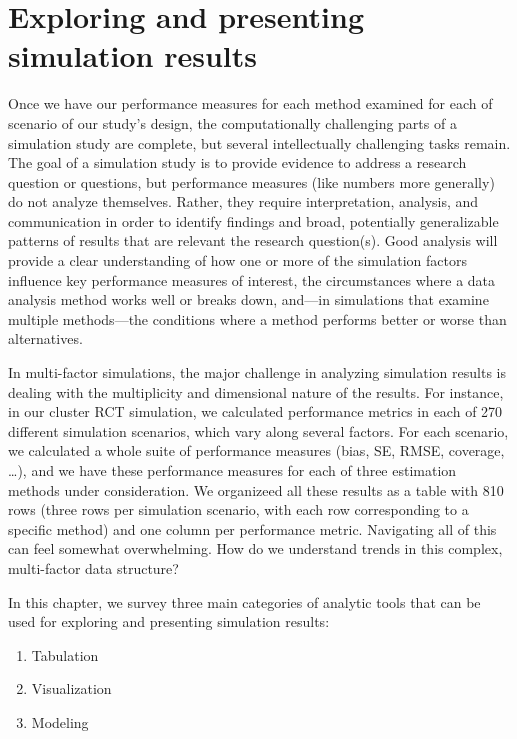 \documentclass[
]{book}
\providecommand{\tightlist}{%
  \setlength{\itemsep}{0pt}\setlength{\parskip}{0pt}}
\begin{document}
\chapter{Exploring and presenting simulation results}\label{presentation-of-results}

Once we have our performance measures for each method examined for each of scenario of our study's design, the computationally challenging parts of a simulation study are complete, but several intellectually challenging tasks remain.
The goal of a simulation study is to provide evidence to address a research question or questions, but
performance measures (like numbers more generally) do not analyze themselves.
Rather, they require interpretation, analysis, and communication in order to identify findings and broad, potentially generalizable patterns of results that are relevant the research question(s).
Good analysis will provide a clear understanding of how one or more of the simulation factors influence key performance measures of interest, the circumstances where a data analysis method works well or breaks down, and---in simulations that examine multiple methods---the conditions where a method performs better or worse than alternatives.

In multi-factor simulations, the major challenge in analyzing simulation results is dealing with the multiplicity and dimensional nature of the results.
For instance, in our cluster RCT simulation, we calculated performance metrics in each of 270 different simulation scenarios, which vary along several factors.
For each scenario, we calculated a whole suite of performance measures (bias, SE, RMSE, coverage, \ldots), and we have these performance measures for each of three estimation methods under consideration.
We organizeed all these results as a table with 810 rows (three rows per simulation scenario, with each row corresponding to a specific method) and one column per performance metric.
Navigating all of this can feel somewhat overwhelming.
How do we understand trends in this complex, multi-factor data structure?

In this chapter, we survey three main categories of analytic tools that can be used for exploring and presenting simulation results:

\begin{enumerate}
\def\labelenumi{\arabic{enumi}.}
\tightlist
\item
  Tabulation
\item
  Visualization
\item
  Modeling
\end{enumerate}
\end{document}
